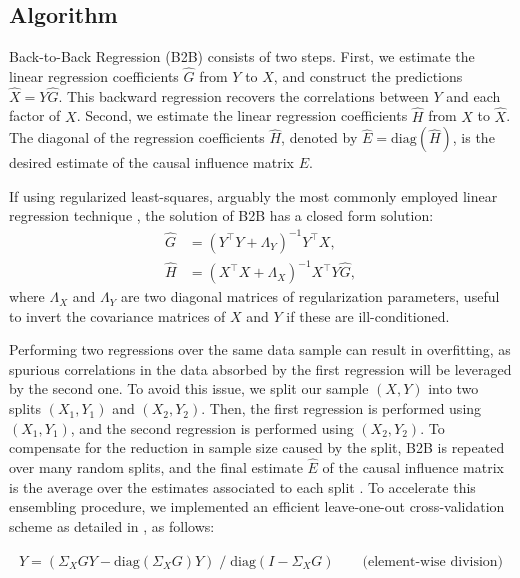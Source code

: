 \documentclass{article}
\begin{document}
\subsection{Algorithm}


Back-to-Back Regression (B2B) consists of two steps.
%
First, we estimate the linear regression coefficients $\hat G$ from $Y$ to $X$, and construct the predictions $\hat X = Y \hat G$.
%
This backward regression recovers the correlations between $Y$ and each factor of $X$.
%
Second, we estimate the linear regression coefficients $\hat H$ from $X$ to $\hat X$.
%
The diagonal of the regression coefficients $\hat H$, denoted by $\hat{E} = \text{diag}(\hat{H})$, is the desired estimate of the causal influence matrix $E$.

If using regularized least-squares, arguably the most commonly employed linear regression technique \citep{hoerl1959optimum, rifkin2007notes}, the solution of B2B has a closed form solution:
\begin{align}
    \hat G &= (Y^\top Y + \Lambda_Y)^{-1} Y^\top X,\label{eq:solG}\\
    \hat H &=(X^\top X + \Lambda_X)^{-1} X^\top Y \hat G,\label{eq:solH}
\end{align}
%
where $\Lambda_X$ and $\Lambda_Y$ are two diagonal matrices of regularization parameters, useful to invert the covariance matrices of $X$ and $Y$ if these are ill-conditioned.

Performing two regressions over the same data sample can result in overfitting, as spurious correlations in the data absorbed by the first regression will be leveraged by the second one.
%
To avoid this issue, we split our sample $(X, Y)$ into two splits $(X_1, Y_1)$ and $(X_2, Y_2)$.
%
Then, the first regression is performed using $(X_1, Y_1)$, and the second regression is performed using $(X_2, Y_2)$.
%
To compensate for the reduction in sample size caused by the split, B2B is repeated over many random splits, and the final estimate $\hat E$ of the causal influence matrix is the average over the estimates associated to each split \citep{breiman1996bagging}.
%
To accelerate this ensembling procedure, we implemented an efficient leave-one-out cross-validation scheme as detailed in \citep{rifkin2007notes} %
, as follows:
%

\begin{equation}
\hat{Y} = (\Sigma_X G Y - \text{diag}(\Sigma_X G) Y) \;/\; \text{diag}(I - \Sigma_X G) \qquad \text{(element-wise division)}
\end{equation}
\end{document}

